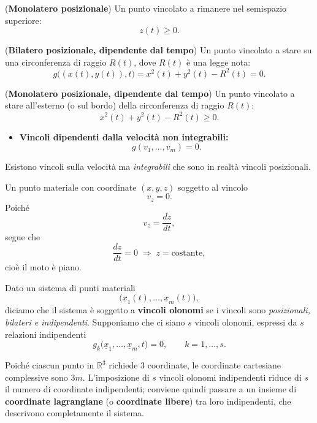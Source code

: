 \begin{example}{}
(\textbf{Monolatero posizionale}) Un punto vincolato a rimanere nel semispazio superiore:
\[
z(t)\ge 0.
\]
\end{example}

\begin{example}{}
(\textbf{Bilatero posizionale, dipendente dal tempo}) Un punto vincolato a stare su una circonferenza di raggio $R(t)$, dove $R(t)$ è una legge nota:
\[
g\bigl((x(t),y(t)),t\bigr)=x^2(t)+y^2(t)-R^2(t)=0.
\]
\end{example}

\begin{example}{}
(\textbf{Monolatero posizionale, dipendente dal tempo}) Un punto vincolato a stare all'esterno (o sul bordo) della circonferenza di raggio $R(t)$:
\[
x^2(t)+y^2(t)-R^2(t)\ge 0.
\]
\end{example}

\begin{itemize}
\item \textbf{Vincoli dipendenti dalla velocità non integrabili:}
\[
g(v_1,\dots,v_m)=0.
\]
\end{itemize}

\begin{oss}{}
Esistono vincoli sulla velocità ma \emph{integrabili} che sono in realtà vincoli posizionali.
\end{oss}

\begin{example}{}
Un punto materiale con coordinate $(x,y,z)$ soggetto al vincolo
\[
v_z=0.
\]
Poiché
\[
v_z=\frac{dz}{dt},
\]
segue che
\[
\frac{dz}{dt}=0 \;\Rightarrow\; z=\text{costante},
\]
cioè il moto è piano.
\end{example}

Dato un sistema di punti materiali
\[
\bigl(\underline{x}_1(t),\dots,\underline{x}_m(t)\bigr),
\]
diciamo che il sistema è soggetto a \textbf{vincoli olonomi} se i vincoli sono \emph{posizionali, bilateri e indipendenti}.
Supponiamo che ci siano $s$ vincoli olonomi, espressi da $s$ relazioni indipendenti
\[
g_k\bigl(\underline{x}_1,\dots,\underline{x}_m,t\bigr)=0,
\qquad k=1,\dots,s.
\]

Poiché ciascun punto in $\mathbb{R}^3$ richiede $3$ coordinate, le coordinate cartesiane complessive sono $3m$.
L'imposizione di $s$ vincoli olonomi indipendenti riduce di $s$ il numero di coordinate indipendenti; conviene quindi passare a un insieme di
\textbf{coordinate lagrangiane} (o \textbf{coordinate libere}) tra loro indipendenti, che descrivono completamente il sistema.

